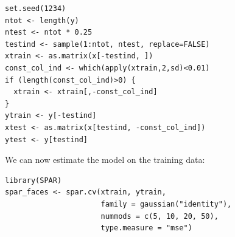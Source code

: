 \documentclass[
  article]{jss}
\begin{document}
\begin{verbatim}
set.seed(1234)
ntot <- length(y)
ntest <- ntot * 0.25
testind <- sample(1:ntot, ntest, replace=FALSE)
xtrain <- as.matrix(x[-testind, ])
const_col_ind <- which(apply(xtrain,2,sd)<0.01)
if (length(const_col_ind)>0) {
  xtrain <- xtrain[,-const_col_ind]
}
ytrain <- y[-testind]
xtest <- as.matrix(x[testind, -const_col_ind])
ytest <- y[testind]
\end{verbatim}

We can now estimate the model on the training data:

\begin{verbatim}
library(SPAR)
spar_faces <- spar.cv(xtrain, ytrain,
                      family = gaussian("identity"),
                      nummods = c(5, 10, 20, 50),
                      type.measure = "mse")
\end{verbatim}
\end{document}
